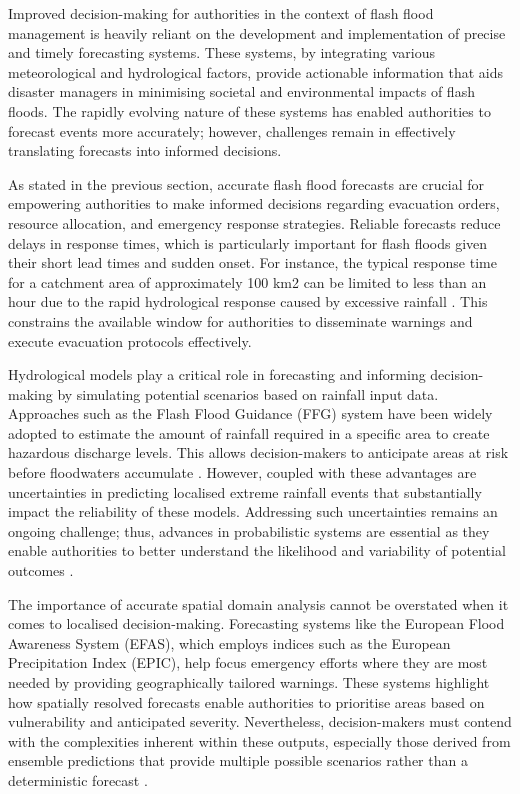 Improved decision-making for authorities in the context of flash flood management is heavily reliant on the development and implementation of precise and timely forecasting systems. These systems, by integrating various meteorological and hydrological factors, provide actionable information that aids disaster managers in minimising societal and environmental impacts of flash floods. The rapidly evolving nature of these systems has enabled authorities to forecast events more accurately; however, challenges remain in effectively translating forecasts into informed decisions. 

As stated in the previous section, accurate flash flood forecasts are crucial for empowering authorities to make informed decisions regarding evacuation orders, resource allocation, and emergency response strategies. Reliable forecasts reduce delays in response times, which is particularly important for flash floods given their short lead times and sudden onset. For instance, the typical response time for a catchment area of approximately 100 km2 can be limited to less than an hour due to the rapid hydrological response caused by excessive rainfall \citep{Maqtan2022a, Maqtan2022b}. This constrains the available window for authorities to disseminate warnings and execute evacuation protocols effectively.

Hydrological models play a critical role in forecasting and informing decision-making by simulating potential scenarios based on rainfall input data. Approaches such as the Flash Flood Guidance (FFG) system have been widely adopted to estimate the amount of rainfall required in a specific area to create hazardous discharge levels. This allows decision-makers to anticipate areas at risk before floodwaters accumulate \citep{Georgakakos_2022}. However, coupled with these advantages are uncertainties in predicting localised extreme rainfall events that substantially impact the reliability of these models. Addressing such uncertainties remains an ongoing challenge; thus, advances in probabilistic systems are essential as they enable authorities to better understand the likelihood and variability of potential outcomes \citep{Yussouf2020}.

The importance of accurate spatial domain analysis cannot be overstated when it comes to localised decision-making. Forecasting systems like the European Flood Awareness System (EFAS), which employs indices such as the European Precipitation Index (EPIC), help focus emergency efforts where they are most needed by providing geographically tailored warnings. These systems highlight how spatially resolved forecasts enable authorities to prioritise areas based on vulnerability and anticipated severity. Nevertheless, decision-makers must contend with the complexities inherent within these outputs, especially those derived from ensemble predictions that provide multiple possible scenarios rather than a deterministic forecast \citep{Silvestro2017}.

